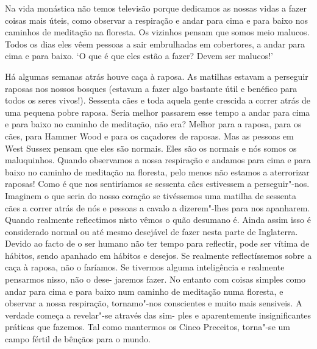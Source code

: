Na vida monástica não temos televisão porque dedicamos as nossas vidas a
fazer coisas mais úteis, como observar a respiração e andar para cima e
para baixo nos caminhos de meditação na floresta. Os vizinhos pensam que
somos meio malucos. Todos os dias eles vêem pessoas a sair embrulhadas
em cobertores, a andar para cima e para baixo. `O que é que eles estão a
fazer? Devem ser malucos!'

Há algumas semanas atrás houve caça à raposa. As matilhas estavam a
perseguir raposas nos nossos bosques (estavam a fazer algo bastante útil
e benéfico para todos os seres vivos!). Sessenta cães e toda aquela
gente crescida a correr atrás de uma pequena pobre raposa. Seria melhor
passarem esse tempo a andar para cima e para baixo no caminho de
meditação, não era? Melhor para a raposa, para os cães, para Hammer Wood
e para os caçadores de raposas. Mas as pessoas em West Sussex pensam que
eles são normais. Eles são os normais e nós somos os maluquinhos. Quando
observamos a nossa respiração e andamos para cima e para baixo no
caminho de meditação na floresta, pelo menos não
estamos a aterrorizar raposas! Como é que nos sentiríamos se
sessenta cães estivessem a perseguir"-nos. Imaginem o que seria do nosso
coração se tivéssemos uma matilha de sessenta cães a correr atrás de nós
e pessoas a cavalo a dizerem"-lhes para nos apanharem. Quando realmente
reflectimos nisto vêmos o quão desumano é. Ainda assim isso é
considerado normal ou até mesmo desejável de fazer nesta parte de
Inglaterra. Devido ao facto de o ser humano não ter tempo para
reflectir, pode ser vítima de hábitos, sendo apanhado em hábitos e
desejos. Se realmente reflectíssemos sobre a caça à raposa, não o
faríamos. Se tivermos alguma inteligência e realmente pensarmos nisso,
não o dese- jaremos fazer. No entanto com coisas simples como andar para
cima e para baixo num caminho de meditação numa floresta, e observar a
nossa respiração, tornamo"-nos conscientes e muito mais sensiveis. A
verdade começa a revelar"-se através das sim- ples e aparentemente
insignificantes práticas que fazemos. Tal como mantermos os Cinco
Preceitos, torna"-se um campo fértil de bênçãos para o mundo.

